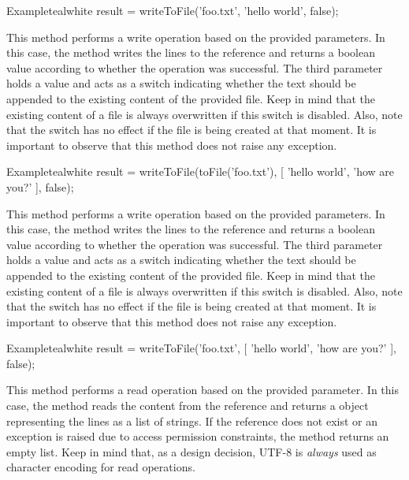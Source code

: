 \begin{description}
\begin{codebox}{Example}{teal}{\icnote}{white}
result = writeToFile('foo.txt', 'hello world', false);
\end{codebox}

\item[\mdbox{R}{writeToFile(File file, List<String> lines, boolean append)}{boolean}] This method performs a write operation based on the provided parameters. In this case, the method writes the  lines to the  reference and returns a boolean value according to whether the operation was successful. The third parameter holds a  value and acts as a switch indicating whether the text should be appended to the existing content of the provided file. Keep in mind that the existing content of a file is always overwritten if this switch is disabled. Also, note that the switch has no effect if the file is being created at that moment. It is important to observe that this method does not raise any exception.

\begin{codebox}{Example}{teal}{\icnote}{white}
result = writeToFile(toFile('foo.txt'),
         [ 'hello world', 'how are you?' ], false);
\end{codebox}

\item[\mdbox{R}{\parbox{0.51\textwidth}{writeToFile(String reference,\\\hspace*{1em} List<String> lines, boolean append)}}{boolean}] This method performs a write operation based on the provided parameters. In this case, the method writes the  lines to the  reference and returns a boolean value according to whether the operation was successful. The third parameter holds a  value and acts as a switch indicating whether the text should be appended to the existing content of the provided file. Keep in mind that the existing content of a file is always overwritten if this switch is disabled. Also, note that the switch has no effect if the file is being created at that moment. It is important to observe that this method does not raise any exception.

\begin{codebox}{Example}{teal}{\icnote}{white}
result = writeToFile('foo.txt', [ 'hello world',
         'how are you?' ], false);
\end{codebox}

\item[\mdbox{R}{readFromFile(File file)}{List<String>}] This method performs a read operation based on the provided parameter. In this case, the method reads the content from the  reference and returns a  object representing the lines as a list of strings. If the reference does not exist or an exception is raised due to access permission constraints, the  method returns an empty list. Keep in mind that, as a design decision, UTF-8 is \emph{always} used as character encoding for read operations.


\end{description}
